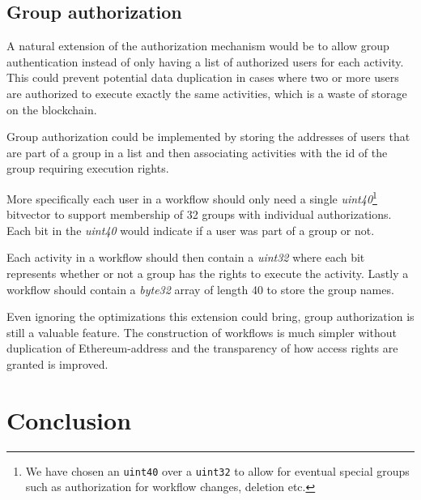 \documentclass{article}
\begin{document}
		\subsection{Group authorization}
		A natural extension of the authorization mechanism would be to allow group authentication instead of only having a list of authorized users for each activity.
		This could prevent potential data duplication in cases where two or more users are authorized to execute exactly the same activities, which is a waste of storage on the blockchain.

		Group authorization could be implemented by storing the addresses of users that are part of a group in a list and then associating activities with the id of the group requiring execution rights.

		More specifically each user in a workflow should only need a single \emph{uint40}\footnote{We have chosen an \texttt{uint40} over a \texttt{uint32} to allow for eventual special groups such as authorization for workflow changes, deletion etc.} bitvector to support membership of 32 groups with individual authorizations. Each bit in the \emph{uint40} would indicate if a user was part of a group or not.

		Each activity in a workflow should then contain a \emph{uint32} where each bit represents whether or not a group has the rights to execute the activity.
		Lastly a workflow should contain a \emph{byte32} array of length 40 to store the group names.

		Even ignoring the optimizations this extension could bring, group authorization is still a valuable feature.
		The construction of workflows is much simpler without duplication of Ethereum-address and the transparency of how access rights are granted is improved.
		
	\section{Conclusion}
\end{document}
